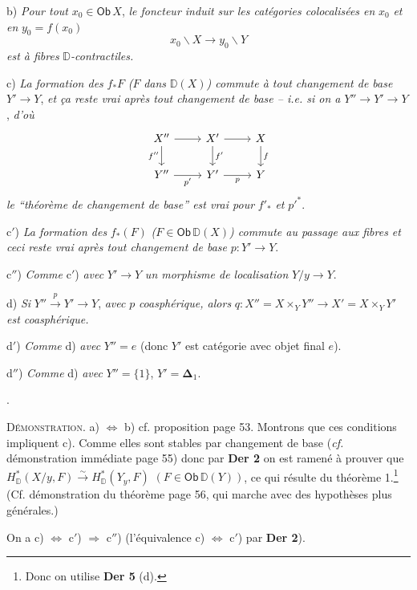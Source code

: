 \documentclass[11pt,leqno]{article}
\newcommand{\printedpage}[1]{\marginpar{\footnotesize p.~#1}}
\newcommand{\msp}[1]{\marginpar{\footnotesize [#1]}}
\newcommand{\Ob}{\mathsf{Ob}}
\newcommand{\D}{\mathbb{D}}
\begin{document}
b) \textit{Pour tout} $x_0 \in \Ob\, X$, \textit{le foncteur induit sur les catégories colocalisées en} $x_0$ \textit{et en} $y_0 = f(x_0)$
\[
x_0\backslash X \longrightarrow y_0\backslash Y
\]
\textit{est à fibres} $\D$\textit{-contractiles.}

\msp{page 69}

c) \textit{La formation des} $f_*F$ \textit{(}$F$ \textit{dans} $\D(X)$\textit{) commute à tout changement de base} $Y' \to Y$, \textit{et ça reste vrai après tout changement de base -- i.e. si on a} $Y'' \to Y' \to Y$, \textit{d'où}
\[
\begin{tikzcd}
X'' \arrow[r] \arrow[d, "f''"{swap}] & X' \arrow[r] \arrow[d, "f'"] & X \arrow[d, "f"] \\
Y'' \arrow[r, "p'"{swap}] & Y' \arrow[r, "p"{swap}] & Y
\end{tikzcd}
\]
\textit{le “théorème de changement de base” est vrai pour} $f'_*$ \textit{et} $p'^{*}$.

c$'$) \textit{La formation des} $f_*(F)$ \textit{(}$F \in \Ob\, \D(X)$\textit{) commute au passage aux fibres et ceci reste vrai après tout changement de base} $p : Y' \to Y$.

c$''$) \textit{Comme} c$'$) \textit{avec} $Y' \to Y$ \textit{un morphisme de localisation} $Y/y \to Y$.

d) \textit{Si} $Y'' \overset{p}{\to} Y' \to Y$, \textit{avec} $p$ \textit{coasphérique, alors} $q : X'' = X \times_Y Y'' \to X' = X \times_Y Y'$ \textit{est coasphérique.}

\printedpage{41}

d$'$) \textit{Comme} d) \textit{avec} $Y'' = e$ (donc $Y'$ est catégorie avec objet final $e$).

d$''$) \textit{Comme} d) \textit{avec} $Y'' = \{1\}$, $Y' = \boldsymbol{\Delta}_1$.

.

\noindent\textsc{Démonstration}. a) $\Leftrightarrow$ b) cf. proposition page 53. Montrons que ces conditions impliquent c). Comme elles sont stables par changement de base (\textit{cf.} démonstration immédiate page 55) donc par \textbf{Der 2} on est ramené à prouver que $H^*_{\D}(X/y, F) \overset{\sim}{\to} H^*_{\D}(Y_y, F)$ $(F \in \Ob\, \D(Y))$, ce qui résulte du théorème 1.\footnote[30]{Donc on utilise \textbf{Der 5} (d).} (Cf. démonstration du théorème page 56, qui marche avec des hypothèses plus générales.)

On a c) $\Leftrightarrow$ c$'$) $\Rightarrow$ c$''$) (l'équivalence c) $\Leftrightarrow$ c$'$) par \textbf{Der 2}).
\end{document}
